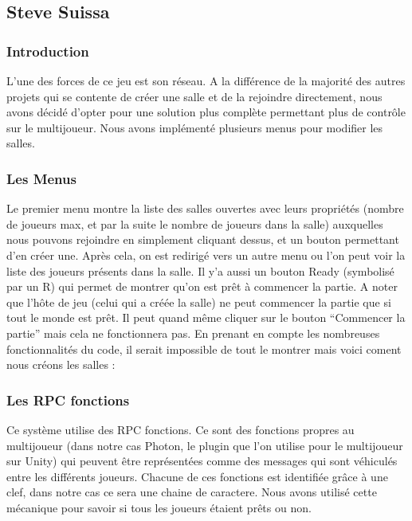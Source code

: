 \documentclass{article}
\begin{document}


 
\newpage
\subsection{Steve Suissa}


\subsubsection{Introduction}

L’une des forces de ce jeu est son réseau. A la différence de la majorité des autres projets qui se contente de créer une salle et de la rejoindre directement, nous avons décidé d’opter pour une solution plus complète permettant plus de contrôle sur le multijoueur. Nous avons implémenté plusieurs menus pour modifier les salles.

\subsubsection{Les Menus}

Le premier menu montre la liste des salles ouvertes avec leurs propriétés (nombre de joueurs max, et par la suite le nombre de joueurs dans la salle) auxquelles nous pouvons rejoindre en simplement cliquant dessus, et un bouton permettant d’en créer une.
Après cela, on est redirigé vers un autre menu ou l’on peut voir la liste des joueurs présents dans la salle. Il y’a aussi un bouton Ready (symbolisé par un R) qui permet de montrer qu’on est prêt à commencer la partie. A noter que l’hôte de jeu (celui qui a créée la salle) ne peut commencer la partie que si tout le monde est prêt. Il peut quand même cliquer sur le bouton “Commencer la partie” mais cela ne fonctionnera pas. En prenant en compte les nombreuses fonctionnalités du code, il serait impossible de tout le montrer mais voici coment nous créons les salles : 

\subsubsection{Les RPC fonctions}

Ce système utilise des RPC fonctions. Ce sont des fonctions propres au multijoueur (dans notre cas Photon, le plugin que l’on utilise pour le multijoueur sur Unity) qui peuvent être représentées comme des messages qui sont véhiculés entre les différents joueurs. Chacune de ces fonctions est identifiée grâce à une clef, dans notre cas ce sera une chaine de caractere. Nous avons utilisé cette mécanique pour savoir si tous les joueurs étaient prêts ou non.
\end{document}
